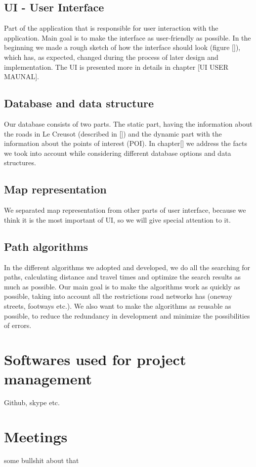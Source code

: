\subsection{UI - User Interface}
Part of the application that is responsible for user interaction with the application. Main goal is to make the interface as user-friendly as possible. In the beginning we made a rough sketch of how the interface should look (figure []), which has, as expected, changed during the process of later design and implementation. The UI is presented more in details in chapter [UI USER MAUNAL].
\subsection{Database and data structure}
Our database consists of two parts. The static part, having the information about the roads in Le Creusot (described in []) and the dynamic part with the information about the points of interest (POI). In chapter[] we address the facts we took into account while considering different database options and data structures.
\subsection{Map representation}
We separated map representation from other parts of user interface, because we think it is the most important of UI, so we will give special attention to it.
\subsection{Path algorithms}
In the different algorithms we adopted and developed, we do all the searching for paths, calculating distance and travel times and optimize the search results as much as possible. Our main goal is to make the algorithms work as  quickly as possible, taking into account all the restrictions road networks has (oneway streets, footways etc.). We also want to make the algorithms as reusable as possible, to reduce the redundancy in development and minimize the possibilities of errors.

\section{Softwares used for project management}
Github, skype etc.
\section{Meetings}
some bullshit about that

